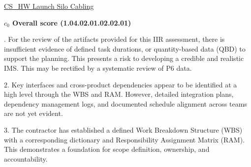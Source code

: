 % 


\begin{frame}{\href{run:../local/source-docs/1.04.02.01.02.02.01.pdf}{CS\_HW Launch Silo Cabling}}
\centering
{}
\par
\vspace{0.75em}
\textbf{\small{\(c_0\) Overall score {\tiny (1.04.02.01.02.02.01)}}}\\\par
\vspace{0.5em}
\begin{minipage}{0.85\textwidth}
\raggedright
\fontsize{7}{9}. For the review of the artifacts provided for this IIR assessment, there is insufficient evidence of defined task durations, or quantity-based data (QBD) to support the planning. This presents a risk to developing a credible and realistic IMS. This may be rectified by a systematic review of P6 data.\par\vspace{0.5em}2. Key interfaces and cross-product dependencies appear to be identified at a high level through the WBS and RAM. However, detailed integration plans, dependency management logs, and documented schedule alignment across teams are not yet evident.\par\vspace{0.5em}3. The contractor has established a defined Work Breakdown Structure (WBS) with a corresponding dictionary and Responsibility Assignment Matrix (RAM). This demonstrates a foundation for scope definition, ownership, and accountability.\par
\end{minipage}
\end{frame}
